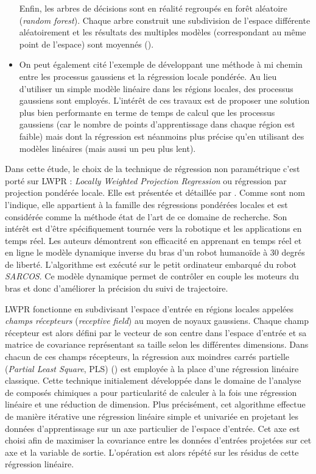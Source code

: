 \begin{itemize}
        Enfin, les arbres de décisions sont en réalité regroupés en forêt aléatoire (\textit{random forest}).
        Chaque arbre construit une subdivision de l'espace différente aléatoirement et les résultats 
        des multiples modèles (correspondant au même point de l'espace) 
        sont moyennés (\cite{liaw_classification_2002}).
    \item On peut également cité l'exemple de \cite{nguyen-tuong_model_2009} développant une méthode
        à mi chemin entre les processus gaussiens et la régression locale pondérée.
        Au lieu d'utiliser un simple modèle linéaire dans les régions locales, 
        des processus gaussiens sont employés.
        L'intérêt de ces travaux est de proposer une solution plus bien performante en terme de temps de calcul
        que les processus gaussiens (car le nombre de points d'apprentissage dans chaque région est faible) 
        mais dont la régression est néanmoins plus précise qu'en utilisant des
        modèles linéaires (mais aussi un peu plus lent).\\
\end{itemize}

Dans cette étude, le choix de la technique de régression non paramétrique 
c'est porté sur LWPR : \textit{Locally Weighted Projection Regression} ou 
régression par projection pondérée locale. Elle est présentée et détaillée 
par \cite{vijayakumar_incremental_2005}.
Comme sont nom l'indique, elle appartient à la famille des régressions pondérées locales
et est considérée comme la méthode état de l'art de ce domaine de recherche.
Son intérêt est d'être spécifiquement tournée vers la robotique et les applications
en temps réel. 
Les auteurs démontrent son efficacité en apprenant en temps réel et en ligne le
modèle dynamique inverse du bras d'un robot humanoïde à 30 degrés de liberté.
L'algorithme est exécuté sur le petit ordinateur embarqué du robot \textit{SARCOS}.
Ce modèle dynamique permet de contrôler en couple les moteurs du bras et donc d'améliorer 
la précision du suivi de trajectoire.

LWPR fonctionne en subdivisant l'espace d'entrée en régions locales appelées 
\textit{champs récepteurs} (\textit{receptive field}) au moyen de noyaux gaussiens. 
Chaque champ récepteur est alors défini par le vecteur de son centre dans l'espace 
d'entrée et sa matrice de covariance représentant sa taille selon les différentes dimensions.
Dans chacun de ces champs récepteurs, la régression aux moindres carrés partielle 
(\textit{Partial Least Square}, PLS) (\cite{wold_pls-regression:_2001}) est employée
à la place d'une régression linéaire classique.
Cette technique initialement développée dans le domaine de l'analyse de composés chimiques 
a pour particularité de calculer à la fois une régression linéaire et une 
réduction de dimension. 
Plus précisément, cet algorithme effectue de manière itérative une régression
linéaire simple et univariée en projetant les données d'apprentissage sur un axe 
particulier de l'espace d'entrée.
Cet axe est choisi afin de maximiser la covariance entre les données d'entrées 
projetées sur cet axe et la variable de sortie.
L'opération est alors répété sur les résidus de cette régression linéaire.

